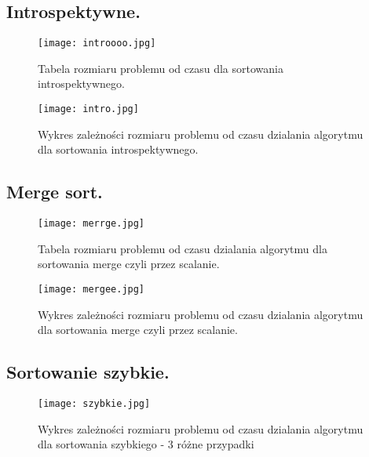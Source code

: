 \documentclass[11pt]{article}
\begin{document}
\subsection{Introspektywne.}
 \begin{figure}[ht!] 
\centering
 \texttt{[image: introooo.jpg]}
 \caption{Tabela rozmiaru problemu od czasu dla sortowania  introspektywnego.} 
\label{overflow}
 \end{figure}
 
  \begin{figure}[ht!] 
\centering
 \texttt{[image: intro.jpg]}
 \caption{Wykres zależności rozmiaru problemu od czasu dzialania algorytmu dla sortowania introspektywnego.  } 
\label{overflow}
 \end{figure}

\newpage
\subsection{Merge sort.}
 \begin{figure}[h!] 
\centering
 \texttt{[image: merrge.jpg]}
 \caption{Tabela rozmiaru problemu od czasu dzialania algorytmu dla sortowania merge czyli przez scalanie.} 
\label{overflow}
 \end{figure}
 
 \begin{figure}[h!] 
\centering
 \texttt{[image: mergee.jpg]}
 \caption{Wykres zależności rozmiaru problemu od czasu dzialania algorytmu dla sortowania merge czyli przez scalanie.} 
\label{overflow}
 \end{figure}

\newpage
\subsection{Sortowanie szybkie.}
 \begin{figure}[h] 
\centering
 \texttt{[image: szybkie.jpg]}
 \caption{Wykres zależności rozmiaru problemu od czasu dzialania algorytmu dla sortowania szybkiego - 3 różne przypadki } 
\label{overflow}
 \end{figure}
 

\newpage 
\end{document}
